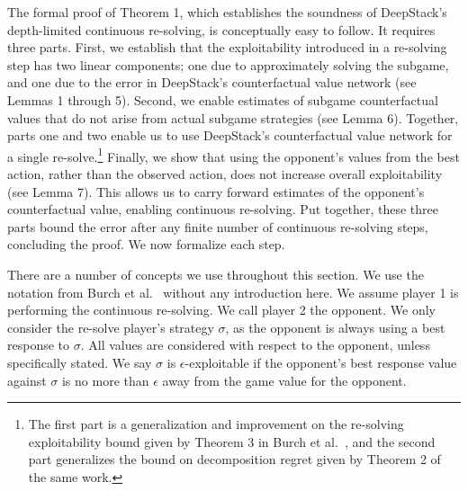 The formal proof of Theorem 1, which establishes the soundness of DeepStack's
depth-limited continuous re-solving, is conceptually easy to follow.   It
requires three parts.  First, we establish that the
exploitability introduced in a re-solving step has two linear components; one due
to approximately solving the subgame, and one due to the error in DeepStack's
counterfactual value network (see Lemmas 1 through 5).  Second, we enable estimates of
subgame counterfactual values that do not arise from actual subgame strategies (see Lemma 6).
Together, parts one and two enable us to use DeepStack's counterfactual value
network for a single re-solve.\footnote{The first part is a generalization and improvement
on the re-solving exploitability bound given by Theorem 3 in Burch et al.~\cite{cprg:cfrd},
and the second part generalizes the bound on decomposition regret given by Theorem 2 of
the same work.}  Finally, we show that using the opponent's values from the
best action, rather than the observed action, does not increase overall
exploitability (see Lemma 7).  This allows us to carry forward estimates of the opponent's
counterfactual value, enabling continuous re-solving.  Put together,
these three parts bound the error after any finite number of continuous re-solving
steps, concluding the proof.  We now formalize each step.

There are a number of concepts we use throughout this section.
We use the notation from Burch et al.~\cite{cprg:cfrd} without any
introduction here.  We assume player 1 is performing the continuous
re-solving.  We call player 2 the opponent.
We only consider the re-solve player's strategy $\sigma$, as the opponent is always using a best response to $\sigma$.
All values are considered with respect to the opponent, unless specifically stated.
We say $\sigma$ is $\epsilon$-exploitable if the opponent's best
response value against $\sigma$ is no more than $\epsilon$ away from
the game value for the opponent.


